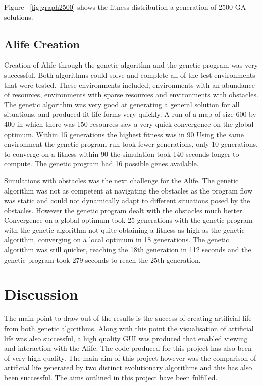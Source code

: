 \documentclass[12pt]{article}
\begin{document}
Figure ~\ref{fig:graph2500} shows the fitness distribution a generation of 2500 GA solutions. 

\subsection{Alife Creation}

Creation of Alife through the genetic algorithm and the genetic program was very successful. Both algorithms could solve and complete all of the test
environments that were tested. These environments included, environments with an abundance of resources, environments with sparse resources and 
environments with obstacles. The genetic algorithm was very good at generating a general solution for all situations, and produced fit life forms
very quickly. A run of a map of size 600 by 400 in which there was 150 resources saw a very quick convergence on the global optimum. Within 
15 generations the highest fitness was in 90%
Using the same environment the genetic program run took fewer generations, only 10 generations, to converge on a fitness within 90%
the simulation took 140 seconds longer to compute. The genetic program had 16 possible genes available. 

Simulations with obstacles was the next challenge for the Alife. The genetic algorithm was not as competent at navigating the obstacles as the
program flow was static and could not dynamically adapt to different situations posed by the obstacles. However the genetic program dealt with
the obstacles much better. Convergence on a global optimum took 25 generations with the genetic program with the genetic algorithm not quite obtaining
a fitness as high as the genetic algorithm, converging on a local optimum in 18 generations. The genetic algorithm was still quicker, reaching the 18th generation
in 112 seconds and the genetic program took 279 seconds to reach the 25th generation.





\section{Discussion}

The main point to draw out of the results is the success of creating artificial life from both genetic algorithms. Along with this point the 
visualisation of artificial life was also successful, a high quality GUI was produced that enabled viewing and interaction with the Alife.
The code produced for this project has also been of very high quality. The main aim of this project however was the comparison of artificial 
life generated by two distinct evolutionary algorithms and this has also been successful. The aims outlined in this project have been fulfilled.
\end{document}
